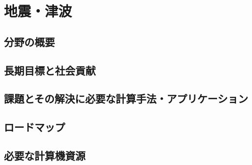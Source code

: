 \section{地震・津波}
\label{sec:地震津波}

\subsection{分野の概要}

\subsection{長期目標と社会貢献}

\subsection{課題とその解決に必要な計算手法・アプリケーション}

\subsection{ロードマップ}

\subsection{必要な計算機資源}


\nocite{*}


